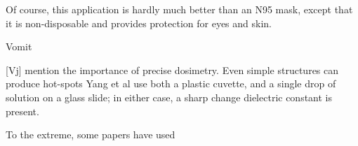 \documentclass[fleqn,10pt]{article}
\begin{document}
\clearpage



Of course, this application is hardly much better than an N95 mask, except that it is non-disposable and provides protection for eyes and skin.

Vomit


[Vj] mention the importance of precise dosimetry. Even simple structures can produce hot-spots 
Yang et al use both a plastic cuvette, and a single drop of solution on a glass slide; in either case, a sharp change dielectric constant is present.

To the extreme, some papers have used


















\end{document}
